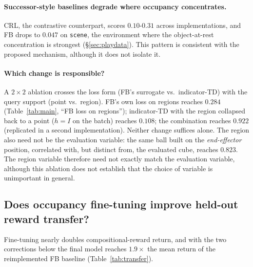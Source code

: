 \documentclass{article}
\begin{document}
\paragraph{Successor-style baselines degrade where occupancy concentrates.}
CRL, the contrastive counterpart, scores $0.10$-$0.31$ across implementations, and FB drops to $0.047$ on \texttt{scene}, the environment where the object-at-rest concentration is strongest (\S\ref{sec:playdata}).
This pattern is consistent with the proposed mechanism, although it does not isolate it.

\paragraph{Which change is responsible?}
A $2\times2$ ablation crosses the loss form (FB's surrogate vs.\ indicator-TD) with the query support (point vs.\ region).
FB's own loss on regions reaches $0.284$ (Table~\ref{tab:main}, ``FB loss on regions''); indicator-TD with the region collapsed back to a point ($h=I$ on the batch) reaches $0.108$; the combination reaches $0.922$ (replicated in a second implementation).
Neither change suffices alone.
The region also need not be the evaluation variable: the same ball built on the \emph{end-effector} position, correlated with, but distinct from, the evaluated cube, reaches $0.823$.
The region variable therefore need not exactly match the evaluation variable, although this ablation does not establish that the choice of variable is unimportant in general.

\subsection{Does occupancy fine-tuning improve held-out reward transfer?}
\label{sec:rq2}\label{sec:reward-transfer}

Fine-tuning nearly doubles compositional-reward return, and with the two corrections below the final model reaches $1.9\times$ the mean return of the reimplemented FB baseline (Table~\ref{tab:transfer}).
\end{document}

